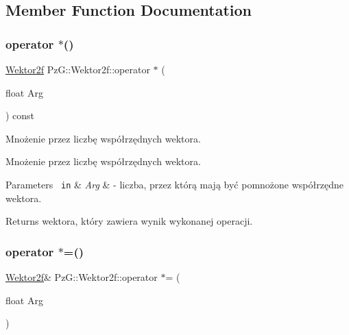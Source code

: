 \subsection{Member Function Documentation}
\mbox{\label{class_pz_g_1_1_wektor2f_a41c29776e710e4d6a88a61d2fed9aed4}} 
\subsubsection{\texorpdfstring{operator $\ast$()}{operator *()}}
{\footnotesize\ttfamily \mbox{\hyperlink{class_pz_g_1_1_wektor2f}{Wektor2f}} Pz\+G\+::\+Wektor2f\+::operator $\ast$ (\begin{DoxyParamCaption}\item[{float}]{Arg }\end{DoxyParamCaption}) const\hspace{0.3cm}{\ttfamily [inline]}}



Mnożenie przez liczbę współrzędnych wektora. 

Mnożenie przez liczbę współrzędnych wektora. 
\begin{DoxyParams}[1]{Parameters}
\mbox{\texttt{ in}}  & {\em Arg} & -\/ liczba, przez którą mają być pomnożone współrzędne wektora. \\
\hline
\end{DoxyParams}
\begin{DoxyReturn}{Returns}
wektora, który zawiera wynik wykonanej operacji. 
\end{DoxyReturn}
\mbox{\label{class_pz_g_1_1_wektor2f_aab3daec875a23c24b24cfc5d8fabb02b}} 
\subsubsection{\texorpdfstring{operator $\ast$=()}{operator *=()}}
{\footnotesize\ttfamily \mbox{\hyperlink{class_pz_g_1_1_wektor2f}{Wektor2f}}\& Pz\+G\+::\+Wektor2f\+::operator $\ast$= (\begin{DoxyParamCaption}\item[{float}]{Arg }\end{DoxyParamCaption})\hspace{0.3cm}{\ttfamily [inline]}}



